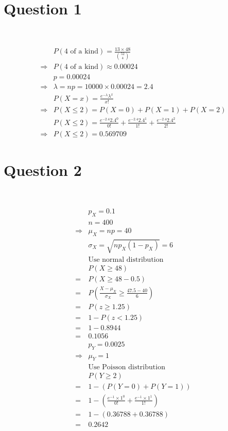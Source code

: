 \documentclass{article}
\begin{document}
\section*{Question 1}

~

\begin{equation*}
    \begin{split}
        &P(4\text{ of a kind})=\frac{13\times 48}{\binom{52}{4}}\\
        \Rightarrow&P(4\text{ of a kind})\approx 0.00024\\
        &p=0.00024\\
        \Rightarrow&\lambda =np=10000\times 0.00024=2.4\\
        &P(X=x)=\frac{e^{-\lambda }\lambda ^x}{x!}\\
        \Rightarrow&P(X\leqslant 2)=P(X=0)+P(X=1)+P(X=2)\\
        &P(X\leqslant2)=\frac{e^{-2.4 }2.4 ^0}{0!}+\frac{e^{-2.4 }2.4 ^1}{1!}+\frac{e^{-2.4 }2.4 ^2}{2!}\\
        \Rightarrow&P(X\leqslant2)=0.569709
    \end{split}
\end{equation*}

\newpage

\section*{Question 2}

~

\begin{equation*}
    \begin{split}
        &p_X=0.1\\
        &n=400\\
        \Rightarrow&\mu_X=np=40\\
        &\sigma_X=\sqrt{np_X(1-p_X)}=6\\
        &\text{Use normal distribution}\\
        &P(X\geqslant 48)\\
        =&P(X\geqslant 48-0.5)\\
        =&P(\frac{X-\mu_X}{\sigma_X}\geqslant\frac{47.5-40}{6})\\
        =&P(z\geqslant1.25)\\
        =&1-P(z<1.25)\\
        =&1-0.8944\\
        =&0.1056\\
        &p_Y=0.0025\\
        \Rightarrow&\mu_Y=1\\
        &\text{Use Poisson distribution}\\
        &P(Y\geqslant 2)\\
        =&1-(P(Y=0)+P(Y=1))\\
        =&1-(\frac{e^{-1}\times 1^0}{0!}+\frac{e^{-1}\times 1^1}{1!})\\
        =&1-(0.36788+0.36788)\\
        =&0.2642\\
    \end{split}
\end{equation*}
\end{document}
